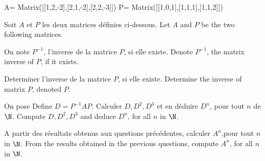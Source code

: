 \begin{sympycode}
A= Matrix([[1,2,-2],[2,1,-2],[2,2,-3]]) 
P= Matrix([[1,0,1],[1,1,1],[1,1,2]])  
\end{sympycode}

\begin{comment}
$\N$
\end{comment}




\iffrancais
Soit $A$ et $P$ les deux matrices définies ci-dessous.
\else
Let $A$ and $P$ be the two following matrices.
\fi


%
%
%
%
%
%




\iffrancais
On note $P^{-1}$, l'inverse de la matrice $P$, si elle existe.
\else
Denote  $P^{-1}$, the matrix inverse of $P$, if it exists.
\fi

\ben

\item 
\iffrancais
Determiner l'inverse de la matrice $P$, si elle existe.
\else
Determine the inverse of matrix $P$, denoted $P$.
\fi



\item
\iffrancais
On pose 
\else
Define
\fi
$D=P^{-1}AP$. 
%
%
\iffrancais
Calculer $D, D^{2}, D^{3}$ et en déduire $D^{n}$, pour tout $n$ de $\N$.
\else
Compute $D, D^{2}, D^{3}$ and deduce $D^{n}$, for all $n$ in $\N$.
\fi


\item
\iffrancais
A partir des résultats obtenus aux questions précédentes, calculer $A^{n}$,pour tout  $n$ in $\N$.
\else
From the results obtained in the previous questions, compute  $A^{n}$, for all $n$ in $\N$.
\fi




\een







